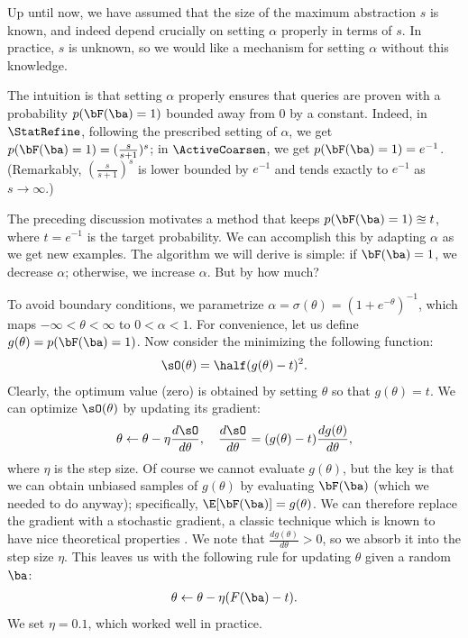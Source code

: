 
Up until now, we have assumed that the size of the maximum abstraction $s$ is
known, and indeed  depend crucially on
setting $\alpha$ properly in terms of $s$.
In practice, $s$ is unknown, so we would like a mechanism for setting $\alpha$
without this knowledge.

The intuition is that setting $\alpha$ properly ensures that queries are proven
with a probability $p(\bF(\ba) = 1)$ bounded away from 0 by a constant.
Indeed, in $\StatRefine$, following the prescribed setting of $\alpha$,
we get $p(\bF(\ba) = 1) = (\frac{s}{s+1})^s$;
in $\ActiveCoarsen$, we get $p(\bF(\ba) = 1) = e^{-1}$.
(Remarkably, $(\frac{s}{s+1})^s$ is lower bounded by $e^{-1}$ and tends
exactly to $e^{-1}$ as $s \to \infty$.)

The preceding discussion motivates a method that keeps $p(\bF(\ba) = 1) \approxeq t$,
where $t = e^{-1}$ is the target probability.
We can accomplish this by adapting $\alpha$ as we get new examples.
The algorithm we will derive is simple: if $\bF(\ba) = 1$, we decrease
$\alpha$; otherwise, we increase $\alpha$.  But by how much?

To avoid boundary conditions, we parametrize $\alpha = \sigma(\theta) = (1 + e^{-\theta})^{-1}$,
which maps $-\infty < \theta < \infty$ to $0 < \alpha < 1$.
For convenience, let us define $g(\theta) = p(\bF(\ba) = 1)$.
Now consider the minimizing the following function:
\begin{align}
\sO(\theta) = \half (g(\theta) - t)^2.
\end{align}
Clearly, the optimum value (zero) is obtained by setting $\theta$ so that $g(\theta) = t$.
We can optimize $\sO(\theta)$ by updating its gradient:
\begin{align}
\theta \leftarrow \theta - \eta \frac{d\sO}{d\theta}, \quad \frac{d\sO}{d\theta} = (g(\theta) - t) \frac{d g(\theta)}{d \theta},
\end{align}
where $\eta$ is the step size.
Of course we cannot evaluate $g(\theta)$,
but the key is that we can obtain unbiased samples of $g(\theta)$ by evaluating $\bF(\ba)$ (which we needed to do anyway);
specifically, $\E[\bF(\ba)] = g(\theta)$.
We can therefore replace the gradient with a stochastic gradient, a classic
technique which is known to have nice theoretical properties \cite{munro51stochastic}.
We note that $\frac{d g(\theta)}{d \theta} > 0$, so we absorb it into the step size $\eta$.
This leaves us with the following rule for updating $\theta$ given a random $\ba$:
\begin{align}
\theta \leftarrow \theta - \eta (F(\ba) - t).
\end{align}
We set $\eta = 0.1$, which worked well in practice.

